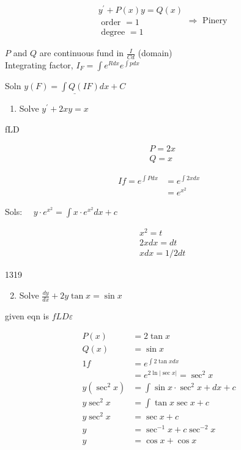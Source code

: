 \documentclass[10pt]{article}
\begin{document}
$$
\begin{aligned}
& y^{\prime}+P(x) y= Q(x) \\
& \text { order }=1 \\
& \text { degree }=1
\end{aligned} \Rightarrow \text { Pinery }
$$

$P$ and $Q$ are continuous fund in $\frac{I}{C d}$ (domain)\\
Integrating factor, $I_{F}=\int e^{R d x} e^{\int p d x}$

Soln $\underline{y(F)=\int Q(I F) d x+C}$

\begin{enumerate}
  \item Solve $y^{\prime}+2 x y=x$
\end{enumerate}

fLD

$$
\begin{aligned}
& P=2 x \\
& Q=x
\end{aligned}
$$

$$
\begin{aligned}
I f=e^{\int P d x} & =e^{\int 2 x d x} \\
& =e^{x^{2}}
\end{aligned}
$$

Sols: $\quad y \cdot e^{x^{2}}=\int x \cdot e^{x^{2}} d x+c$

$$
\begin{aligned}
& x^{2}=t \\
& 2 x d x=d t \\
& x d x=1 / 2 d t
\end{aligned}
$$

1319

\begin{enumerate}
  \setcounter{enumi}{1}
  \item Solve $\frac{d y}{d x}+2 y \tan x=\sin x$
\end{enumerate}

given eqn is $f L D \varepsilon$

$$
\begin{aligned}
P(x) & =2 \tan x \\
Q(x) & =\sin x \\
1 f & =e^{\int 2 \tan x d x} \\
& =e^{2 \ln |\sec x|}=\sec ^{2} x \\
y\left(\sec ^{2} x\right) & =\int \sin x \cdot \sec ^{2} x+d x+c \\
y \sec ^{2} x & =\int \tan x \sec x+c \\
y \sec ^{2} x & =\sec x+c \\
y & =\sec ^{-1} x+c \sec ^{-2} x \\
y & =\cos x+\cos x
\end{aligned}
$$
\end{document}
